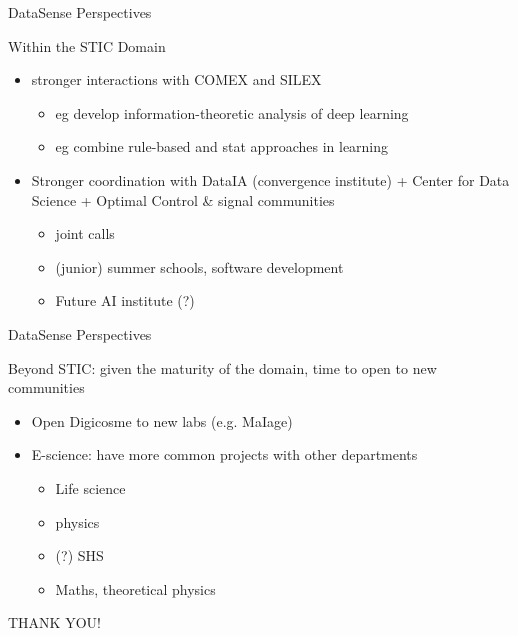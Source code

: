 \begin{frame}{DataSense Perspectives}

Within the STIC Domain

\begin{itemize}
\item stronger interactions with COMEX and SILEX
  \begin{itemize}
  \item eg develop information-theoretic analysis of deep learning
  \item eg combine rule-based and stat approaches in learning
  \end{itemize}
\item Stronger coordination with DataIA (convergence institute) + Center for Data Science + Optimal Control \& signal communities
  \begin{itemize}
  \item joint calls
  \item (junior) summer schools, software development
  \item Future AI institute (?)
  \end{itemize}
\end{itemize}
\end{frame}


\begin{frame}{DataSense Perspectives}

Beyond STIC: given the maturity of the domain, time to open to new communities

\begin{itemize}
\item Open Digicosme to new labs (e.g. MaIage)
\item E-science: have more common projects with  other departments
  \begin{itemize}
  \item Life science
  \item physics
  \item (?) SHS
  \item Maths, theoretical physics
  \end{itemize}
\end{itemize}

\end{frame}

\begin{frame}[plain]{}

  \vfill
  \begin{center}
    \huge THANK YOU!
  \end{center}
  \vfill

\end{frame}

